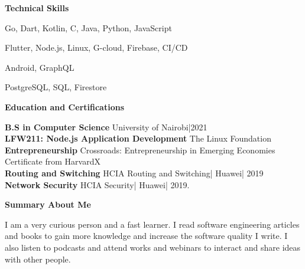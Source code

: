 \documentclass[a4paper]{article}
\begin{document}
\begin{center}
    {\Large \textbf{Technical Skills}}
\end{center}

\begin{description}[noitemsep]
    \item[Languages:] Go, Dart, Kotlin, C, Java, Python, JavaScript
    \item[Platforms and tools:] Flutter, Node.js, Linux, G-cloud, Firebase, CI/CD
    \item[Frameworks:] Android, GraphQL
    \item[Databases:] PostgreSQL, SQL, Firestore
\end{description}

\begin{center}
    {\Large \textbf{Education and Certifications}}
\end{center}

\textbf{B.S in Computer Science} University of Nairobi|2021 \\
\textbf{LFW211: Node.js Application Development} The Linux Foundation \\
\textbf{Entrepreneurship} Crossroads: Entrepreneurship in Emerging Economies Certificate from HarvardX \\
\textbf{Routing and Switching} HCIA Routing and Switching| Huawei| 2019 \\
\textbf{Network Security} HCIA Security| Huawei| 2019. \par

\begin{center}
    {\Large \textbf{Summary About Me} }
\end{center}

I am a very curious person and a fast learner. I read software engineering articles and books to gain more knowledge and increase the software quality I write. I also listen to podcasts and attend works and webinars to interact and share ideas with other people.

\end{document}
